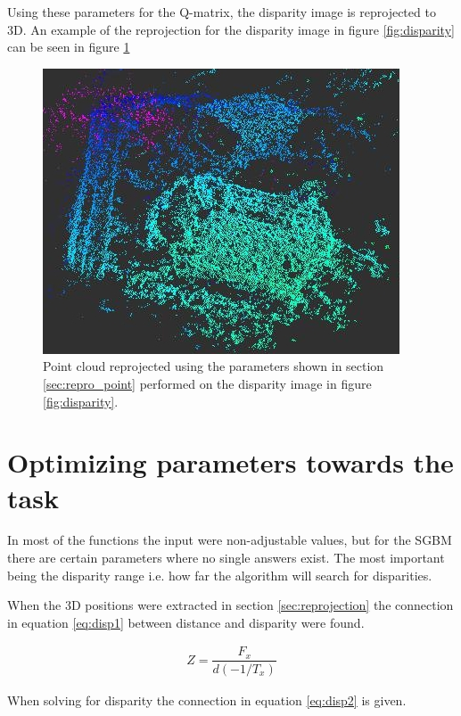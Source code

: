 Using these parameters for the Q-matrix, the disparity image is reprojected to 3D. An example of the reprojection for the disparity image in figure \ref{fig:disparity} can be seen in figure \ref{fig:point_repro}


\begin{figure}[h!]
  \centering
    \includegraphics[scale=0.7]{graphics/06_vision/point_cloud_example2.jpg} %
  \caption{Point cloud reprojected using the parameters shown in section \ref{sec:repro_point} performed on the disparity image in figure \ref{fig:disparity}. }
    \label{fig:point_repro}
\end{figure}


\section{Optimizing parameters towards the task } \label{sec:optimizing_parameters}

In most of the functions the input were non-adjustable values, but for the SGBM there are certain parameters where no single answers exist. The most important being the disparity range i.e. how far the algorithm will search for disparities.


When the 3D positions were extracted in section \ref{sec:reprojection} the connection in equation \ref{eq:disp1} between distance and disparity were found.

\begin{equation}\label{eq:disp1}
\begin{split}
Z = \dfrac{F_{x}}{ d(-1/T_{x})}
\end{split}
\end{equation} 

When solving for disparity the connection in equation \ref{eq:disp2} is given.

